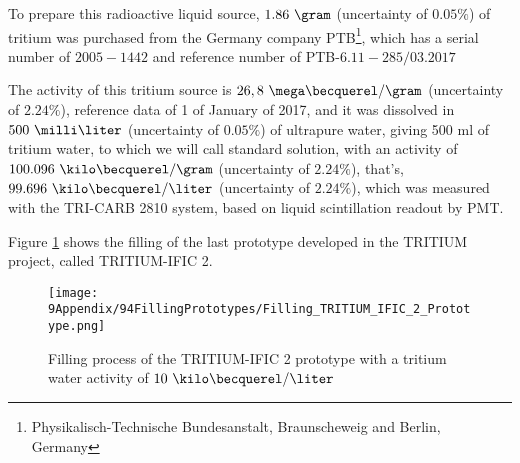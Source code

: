 To prepare this radioactive liquid source, $1.86~\gram$ (uncertainty of $0.05\%$) of tritium was purchased from the Germany company PTB\footnote{Physikalisch-Technische Bundesanstalt, Braunscheweig and Berlin, Germany}, which has a serial number of $2005-1442$ and reference number of PTB-$6.11-285/03.2017$ \cite{TritiumSourceTechnicalFile}


The activity of this tritium source is $26,8~\mega\becquerel/\gram$ (uncertainty of $2.24\%$), reference data of 1 of January of 2017, and it was dissolved in $500~\milli\liter$ (uncertainty of $0.05\%$) of ultrapure water, giving 500 ml of tritium water, to which we will call standard solution, with an activity of $100.096~\kilo\becquerel/\gram$ (uncertainty of $2.24\%$), that's, $99.696~\kilo\becquerel/\liter$ (uncertainty of $2.24\%$), which was measured with the TRI-CARB 2810 system, based on liquid scintillation readout by PMT.

Figure \ref{Fig:TritiumPprototypeFillingProcess} shows the filling of the last prototype developed in the TRITIUM project, called TRITIUM-IFIC 2.

\begin{figure}[hbtp]
\centering
\texttt{[image: 9Appendix/94FillingPrototypes/Filling\_TRITIUM\_IFIC\_2\_Prototype.png]}
\caption{Filling process of the TRITIUM-IFIC 2 prototype with a tritium water activity of $10~\kilo\becquerel/\liter$\label{Fig:TritiumPprototypeFillingProcess}}
\end{figure}
